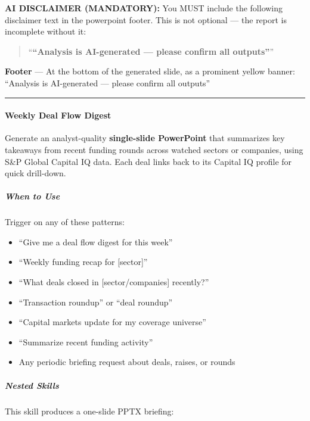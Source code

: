 \documentclass[11pt]{article}
\begin{document}
\textbf{AI DISCLAIMER (MANDATORY):} You MUST include the following disclaimer text in the powerpoint footer. This is not optional — the report is incomplete without it:


\begin{quote}
``\textbf{``Analysis is AI-generated — please confirm all outputs''}''
\end{quote}

\textbf{Footer} — At the bottom of the generated slide, as a prominent yellow banner: ``Analysis is AI-generated — please confirm all outputs''


\vspace{0.5em}\hrule\vspace{0.5em}

\paragraph{Weekly Deal Flow Digest}\mbox{}\par

Generate an analyst-quality \textbf{single-slide PowerPoint} that summarizes key takeaways from recent funding rounds across watched sectors or companies, using S\&P Global Capital IQ data. Each deal links back to its Capital IQ profile for quick drill-down.


\subparagraph{When to Use}\mbox{}\par

Trigger on any of these patterns:

\begin{itemize}[leftmargin=*,itemsep=2pt,topsep=2pt]
\item {} ``Give me a deal flow digest for this week''
\item {} ``Weekly funding recap for [sector]''
\item {} ``What deals closed in [sector/companies] recently?''
\item {} ``Transaction roundup'' or ``deal roundup''
\item {} ``Capital markets update for my coverage universe''
\item {} ``Summarize recent funding activity''
\item {} Any periodic briefing request about deals, raises, or rounds
\end{itemize}

\subparagraph{Nested Skills}\mbox{}\par

This skill produces a one-slide PPTX briefing:
\end{document}
